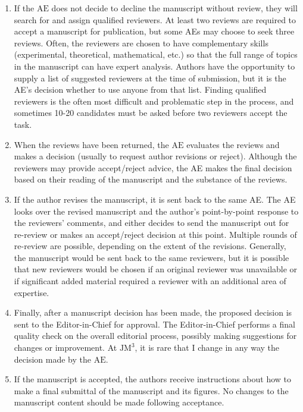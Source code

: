\begin{enumerate}
  \item If the $\mathrm{AE}$ does not decide to decline the manuscript without review, they will search for and assign qualified reviewers. At least two reviews are required to accept a manuscript for publication, but some AEs may choose to seek three reviews. Often, the reviewers are chosen to have complementary skills (experimental, theoretical, mathematical, etc.) so that the full range of topics in the manuscript can have expert analysis. Authors have the opportunity to supply a list of suggested reviewers at the time of submission, but it is the AE's decision whether to use anyone from that list. Finding qualified reviewers is the often most difficult and problematic step in the process, and sometimes 10-20 candidates must be asked before two reviewers accept the task.

  \item When the reviews have been returned, the $\mathrm{AE}$ evaluates the reviews and makes a decision (usually to request author revisions or reject). Although the reviewers may provide accept/reject advice, the AE makes the final decision based on their reading of the manuscript and the substance of the reviews.

  \item If the author revises the manuscript, it is sent back to the same AE. The AE looks over the revised manuscript and the author's point-by-point response to the reviewers' comments, and either decides to send the manuscript out for re-review or makes an accept/reject decision at this point. Multiple rounds of re-review are possible, depending on the extent of the revisions. Generally, the manuscript would be sent back to the same reviewers, but it is possible that new reviewers would be chosen if an original reviewer was unavailable or if significant added material required a reviewer with an additional area of expertise.

  \item Finally, after a manuscript decision has been made, the proposed decision is sent to the Editor-in-Chief for approval. The Editor-in-Chief performs a final quality check on the overall editorial process, possibly making suggestions for changes or improvement. At $\mathrm{JM}^{3}$, it is rare that I change in any way the decision made by the $\mathrm{AE}$.

  \item If the manuscript is accepted, the authors receive instructions about how to make a final submittal of the manuscript and its figures. No changes to the manuscript content should be made following acceptance.


\end{enumerate}
